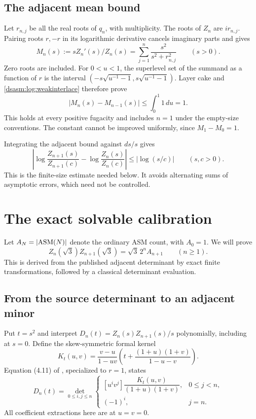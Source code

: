 \documentclass[11pt,letterpaper]{article}
\theoremstyle{remark}\newtheorem{remark}[theorem]{Remark}
\begin{document}
\subsection{The adjacent mean bound}
Let $r_{n,j}$ be all the real roots of $q_n$, with multiplicity.
The roots of $Z_n$ are $ir_{n,j}$. Pairing roots $r,-r$ in its
logarithmic derivative cancels imaginary parts and gives
\begin{equation}\label{dsasm:log:rootmean}
 M_n(s):=sZ_n'(s)/Z_n(s)=\sum_{j=1}^n\frac{s^2}{s^2+r_{n,j}^2}\qquad(s>0).
\end{equation}
Zero roots are included. For $0<u<1$, the superlevel set of the
summand as a function of $r$ is the interval
$(-s\sqrt{u^{-1}-1},s\sqrt{u^{-1}-1})$. Layer cake and
\eqref{dsasm:log:weakinterlace} therefore prove
\[
 |M_n(s)-M_{n-1}(s)|
 \le\int_0^1 1\,du=1.
\]
This holds at every positive fugacity and includes $n=1$ under the
empty-size conventions. The constant cannot be improved uniformly,
since $M_1-M_0=1$.


Integrating the adjacent bound against $ds/s$ gives
\begin{equation}\label{dsasm:log:ratioadjacent}
 \left|\log\frac{Z_{n+1}(s)}{Z_{n+1}(c)}
       -\log\frac{Z_n(s)}{Z_n(c)}\right|
 \le|\log(s/c)|\qquad(s,c>0).
\end{equation}
This is the finite-size estimate needed below. It avoids alternating
sums of asymptotic errors, which need not be controlled.

\section{The exact solvable calibration}
\label{dsasm:log:sec:calibration}
Let $A_N=|\mathrm{ASM}(N)|$ denote the ordinary ASM count, with $A_0=1$.
We will prove
\begin{equation}\label{dsasm:log:calibration}
 Z_n(\sqrt3)Z_{n+1}(\sqrt3)=\sqrt3\,2^n A_{n+1}
 \qquad(n\ge1).
\end{equation}
This is derived from the published adjacent determinant by exact
finite transformations, followed by a classical determinant evaluation.

\subsection{From the source determinant to an adjacent minor}
Put $t=s^2$ and interpret
$D_n(t)=Z_n(s)Z_{n+1}(s)/s$ polynomially, including at $s=0$.
Define the skew-symmetric formal kernel
\begin{equation}\label{dsasm:log:kernel}
 K_t(u,v)=\frac{v-u}{1-uv}
 \left(t+\frac{(1+u)(1+v)}{1-u-v}\right).
\end{equation}
Equation (4.11) of \cite{bfk}, specialized to $r=1$, states
\begin{equation}\label{dsasm:log:sourcedet}
 D_n(t)=\det_{0\le i,j\le n}
 \begin{cases}
 [u^iv^j]\dfrac{K_t(u,v)}{(1+u)(1+v)},&0\le j<n,\\[5pt]
 (-1)^i,&j=n.
 \end{cases}
\end{equation}
All coefficient extractions here are at $u=v=0$.
\end{document}
